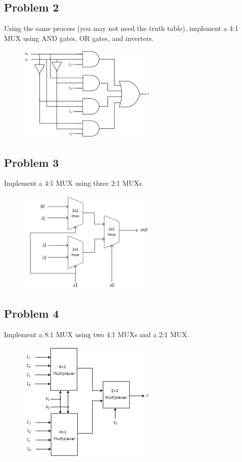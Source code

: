 \documentclass{article}
\begin{document}
\subsection*{Problem 2}
Using the same process (you may not need the truth table), implement a 4:1 MUX using AND gates, OR gates, and inverters.
\begin{figure}[!h]
    \centering
    \includegraphics[width=0.6\textwidth]{figures/mux2_solution.png}
\end{figure}


\subsection*{Problem 3}
Implement a 4:1 MUX using three 2:1 MUXs.
\begin{figure}[!h]
    \centering
    \includegraphics[width=0.6\textwidth]{figures/mux3_solution.png}
\end{figure}

\newpage
\subsection*{Problem 4}
Implement a 8:1 MUX using two 4:1 MUXs and a 2:1 MUX.
\begin{figure}[!h]
    \centering
    \includegraphics[width=0.6\textwidth]{figures/mux4_solution.png}
\end{figure}
\end{document}

